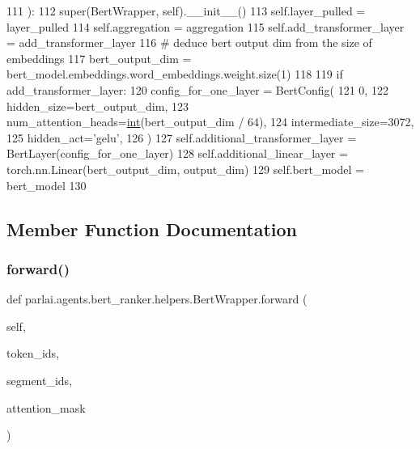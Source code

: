 \begin{DoxyCode}
111     ):
112         super(BertWrapper, self).\_\_init\_\_()
113         self.layer\_pulled = layer\_pulled
114         self.aggregation = aggregation
115         self.add\_transformer\_layer = add\_transformer\_layer
116         \textcolor{comment}{# deduce bert output dim from the size of embeddings}
117         bert\_output\_dim = bert\_model.embeddings.word\_embeddings.weight.size(1)
118 
119         \textcolor{keywordflow}{if} add\_transformer\_layer:
120             config\_for\_one\_layer = BertConfig(
121                 0,
122                 hidden\_size=bert\_output\_dim,
123                 num\_attention\_heads=\hyperlink{namespacelanguage__model_1_1eval__ppl_a7d12ee00479673c5c8d1f6d01faa272a}{int}(bert\_output\_dim / 64),
124                 intermediate\_size=3072,
125                 hidden\_act=\textcolor{stringliteral}{'gelu'},
126             )
127             self.additional\_transformer\_layer = BertLayer(config\_for\_one\_layer)
128         self.additional\_linear\_layer = torch.nn.Linear(bert\_output\_dim, output\_dim)
129         self.bert\_model = bert\_model
130 
\end{DoxyCode}


\subsection{Member Function Documentation}
\mbox{\label{classparlai_1_1agents_1_1bert__ranker_1_1helpers_1_1BertWrapper_a29a138ccda9ff978a641e5f6e0949009}} 
\subsubsection{\texorpdfstring{forward()}{forward()}}
{\footnotesize\ttfamily def parlai.\+agents.\+bert\+\_\+ranker.\+helpers.\+Bert\+Wrapper.\+forward (\begin{DoxyParamCaption}\item[{}]{self,  }\item[{}]{token\+\_\+ids,  }\item[{}]{segment\+\_\+ids,  }\item[{}]{attention\+\_\+mask }\end{DoxyParamCaption})}

